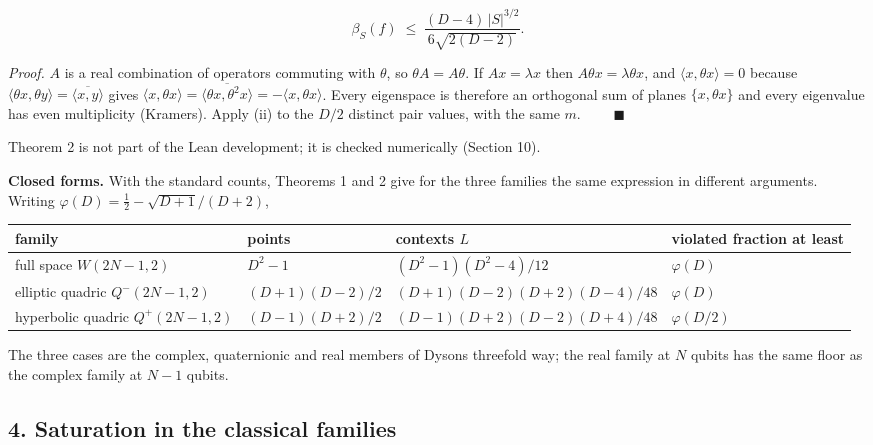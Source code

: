\documentclass[11pt,a4paper]{article}
\begin{document}
\[\beta_S(f) \;\le\; \frac{(D-4)\,|S|^{3/2}}{6\sqrt{2(D-2)}} .\]

\emph{Proof.} \(A\) is a real combination of operators commuting with \(\theta\), so \(\theta A = A \theta\). If
\(A x = \lambda x\) then \(A\theta x = \lambda \theta x\), and \(\langle x, \theta x\rangle = 0\) because
\(\langle \theta x, \theta y\rangle = \overline{\langle x, y \rangle}\) gives
\(\langle x, \theta x\rangle = \overline{\langle \theta x, \theta^2 x\rangle} = -\langle x, \theta x\rangle\).
Every eigenspace is therefore an orthogonal sum of planes \(\{x, \theta x\}\) and every eigenvalue has even
multiplicity (Kramers). Apply (ii) to the \(D/2\) distinct pair values, with the same \(m\).
\(\qquad\blacksquare\)

Theorem 2 is not part of the Lean development; it is checked numerically (Section 10).

\textbf{Closed forms.} With the standard counts, Theorems 1 and 2 give for the three families the same
expression in different arguments. Writing \(\varphi(D) = \tfrac12 - \sqrt{D+1}/(D+2)\),

{\def\LTcaptype{none} %
{\small
\begin{longtable}[]{@{}>{\raggedright\arraybackslash}p{}>{\raggedright\arraybackslash}p{}>{\raggedright\arraybackslash}p{}>{\raggedright\arraybackslash}p{}@{}}
\toprule\noalign{}
family & points & contexts \(L\) & violated fraction at least \\
\midrule\noalign{}
\endhead
\bottomrule\noalign{}
\endlastfoot
full space \(W(2N-1,2)\) & \(D^2-1\) & \((D^2-1)(D^2-4)/12\) & \(\varphi(D)\) \\
elliptic quadric \(Q^-(2N-1,2)\) & \((D+1)(D-2)/2\) & \((D+1)(D-2)(D+2)(D-4)/48\) & \(\varphi(D)\) \\
hyperbolic quadric \(Q^+(2N-1,2)\) & \((D-1)(D+2)/2\) & \((D-1)(D+2)(D-2)(D+4)/48\) & \(\varphi(D/2)\) \\
\end{longtable}
}
}

The three cases are the complex, quaternionic and real members of Dyson\textquotesingle s threefold way; the real
family at \(N\) qubits has the same floor as the complex family at \(N-1\) qubits.

\subsection{4. Saturation in the classical families}\label{4-saturation-in-the-classical-families}
\end{document}
